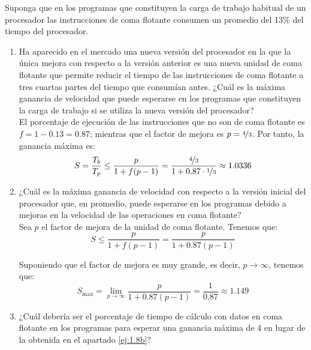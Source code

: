 \begin{ejercicio}
    Suponga que en los programas que constituyen la carga de trabajo habitual de un procesador las
    instrucciones de coma flotante consumen un promedio del 13\% del tiempo del procesador.
    \begin{enumerate}
        \item Ha aparecido en el mercado una nueva versión del procesador en la que la única mejora con respecto a la
        versión anterior es una nueva unidad de coma flotante que permite reducir el tiempo de las instrucciones de
        coma flotante a tres cuartas partes del tiempo que consumían antes. ¿Cuál es la máxima ganancia de
        velocidad que puede esperarse en los programas que constituyen la carga de trabajo si se utiliza la nueva
        versión del procesador?\\

        El porcentaje de ejecución de las instrucciones que no son de coma flotante es $f=1-0.13=0.87$; mientras
        que el factor de mejora es $p=\nicefrac{4}{3}$. Por tanto, la ganancia máxima es:        
        \begin{equation*}
            S = \dfrac{T_b}{T_p} \leq \frac{p}{1+f(p-1)} = \frac{\nicefrac{4}{3}}{1+0.87\cdot \nicefrac{1}{3}} \approx 1.0336
        \end{equation*}

        \item\label{ej:1.8b} ¿Cuál es la máxima ganancia de velocidad con respecto a la versión inicial del procesador que, en
        promedio, puede esperarse en los programas debido a mejoras en la velocidad de las operaciones en coma
        flotante?\\

        Sea $p$ el factor de mejora de la unidad de coma flotante. Tenemos que:
        \begin{equation*}
            S \leq \frac{p}{1+f(p-1)} = \frac{p}{1+0.87(p-1)}
        \end{equation*}

        Suponiendo que el factor de mejora es muy grande, es decir, $p\to\infty$, tenemos que:
        \begin{equation*}
            S_{\max} = \lim_{p\to\infty} \frac{p}{1+0.87(p-1)} = \frac{1}{0.87} \approx 1.149
        \end{equation*}

        \item\label{ej:1.8c} ¿Cuál debería ser el porcentaje de tiempo de cálculo con datos en coma flotante en los programas para
        esperar una ganancia máxima de 4 en lugar de la obtenida en el apartado \ref{ej:1.8b}?\\


\end{enumerate}
\end{ejercicio}
